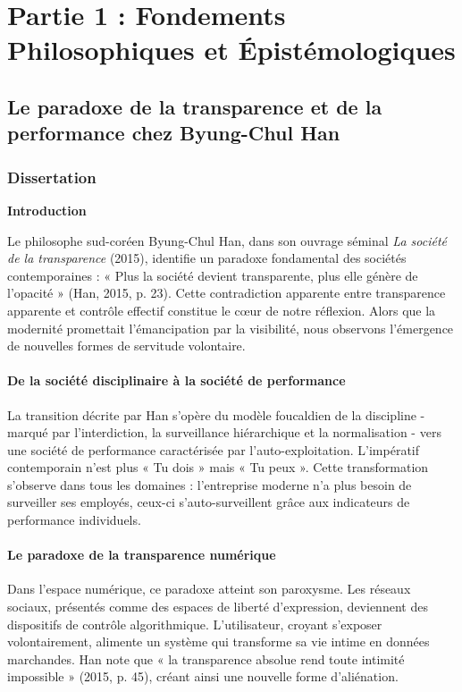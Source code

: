 \documentclass[12pt,a4paper]{article}
\begin{document}
\maketitle


\tableofcontents

\newpage

\section{Partie 1 : Fondements Philosophiques et Épistémologiques}

\subsection{Le paradoxe de la transparence et de la performance chez Byung-Chul Han}

\subsubsection{Dissertation}

\textbf{Introduction}

Le philosophe sud-coréen Byung-Chul Han, dans son ouvrage séminal \textit{La société de la transparence} (2015), identifie un paradoxe fondamental des sociétés contemporaines : « Plus la société devient transparente, plus elle génère de l'opacité » (Han, 2015, p. 23). Cette contradiction apparente entre transparence apparente et contrôle effectif constitue le cœur de notre réflexion. Alors que la modernité promettait l'émancipation par la visibilité, nous observons l'émergence de nouvelles formes de servitude volontaire.


\paragraph{De la société disciplinaire à la société de performance}
La transition décrite par Han s'opère du modèle foucaldien de la discipline - marqué par l'interdiction, la surveillance hiérarchique et la normalisation - vers une société de performance caractérisée par l'auto-exploitation. L'impératif contemporain n'est plus « Tu dois » mais « Tu peux ». Cette transformation s'observe dans tous les domaines : l'entreprise moderne n'a plus besoin de surveiller ses employés, ceux-ci s'auto-surveillent grâce aux indicateurs de performance individuels.

\paragraph{Le paradoxe de la transparence numérique}
Dans l'espace numérique, ce paradoxe atteint son paroxysme. Les réseaux sociaux, présentés comme des espaces de liberté d'expression, deviennent des dispositifs de contrôle algorithmique. L'utilisateur, croyant s'exposer volontairement, alimente un système qui transforme sa vie intime en données marchandes. Han note que « la transparence absolue rend toute intimité impossible » (2015, p. 45), créant ainsi une nouvelle forme d'aliénation.
\end{document}
